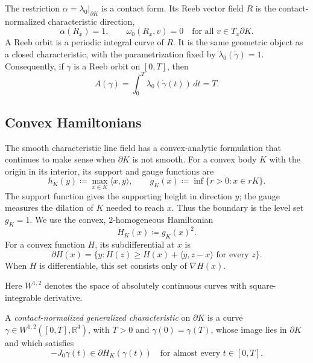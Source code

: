 The restriction \(\alpha=\lambda_0|_{\partial K}\) is a contact form. Its Reeb
vector field \(R\) is the contact-normalized characteristic direction,
\[
  \alpha(R_x)=1,
  \qquad
  \omega_0(R_x,v)=0
  \quad\text{for all }v\in T_x\partial K.
\]
A Reeb orbit is a periodic integral curve of \(R\). It is the same geometric
object as a closed characteristic, with the parametrization fixed by
\(\lambda_0(\dot{\gamma})=1\). Consequently, if \(\gamma\) is a Reeb orbit on
\([0,T]\), then
\[
  A(\gamma)=\int_0^T\lambda_0(\dot{\gamma}(t))\,dt=T.
\]


\subsection{Convex Hamiltonians}
\label{subsec:preliminaries-convex-hamiltonian-language}

The smooth characteristic line field has a convex-analytic formulation that
continues to make sense when \(\partial K\) is not smooth.  For a convex body
\(K\) with the origin in its interior, its support and gauge functions are
\[
  h_K(y)\coloneqq\max_{x\in K}\langle x,y\rangle,
  \qquad
  g_K(x)\coloneqq\inf\{r>0:x\in rK\}.
\]
The support function gives the supporting height in direction $y$;
the gauge measures the dilation of $K$ needed to reach $x$. Thus the boundary
is the level set \(g_K=1\). We use the convex,
\(2\)-homogeneous Hamiltonian
\[
  H_K(x)\coloneqq g_K(x)^2.
\]
For a convex function \(H\), its subdifferential at \(x\) is
\[
  \partial H(x)
  =\{y:H(z)\geq H(x)+\langle y,z-x\rangle
    \text{ for every }z\}.
\]
When \(H\) is differentiable, this set consists only of \(\nabla H(x)\).

Here $W^{1,2}$ denotes the space of absolutely continuous curves with
square-integrable derivative.

\begin{definition}
\label{def:preliminaries-generalized-characteristic}
A \emph{contact-normalized generalized characteristic} on \(\partial K\) is
a curve \(\gamma\in W^{1,2}([0,T],\mathbb R^4)\), with \(T>0\) and
\(\gamma(0)=\gamma(T)\), whose image lies in \(\partial K\) and which satisfies
\begin{equation}\label{eq:preliminaries-generalized-characteristic}
  -J_0\dot\gamma(t)\in\partial H_K(\gamma(t))
  \quad\text{for almost every }t\in[0,T].
\end{equation}
\end{definition}

